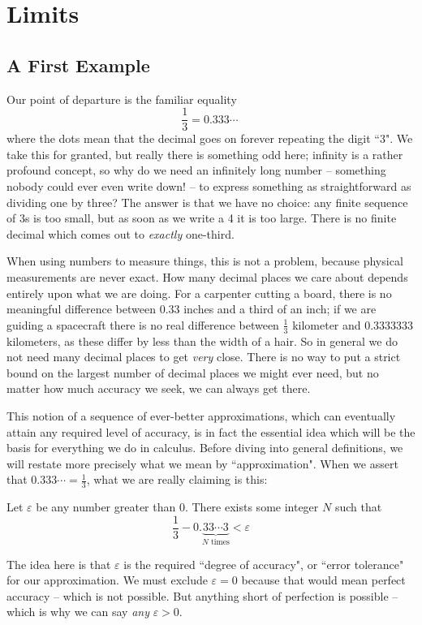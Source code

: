 \section{Limits}
\subsection{A First Example}
Our point of departure is the familiar equality 
\[\label{eq:onethird}
\frac{1}{3} = 0.333\cdots\ 
\]
where the dots mean that the decimal goes on forever repeating the digit ``3". We take this for granted, but really there is something odd here; infinity is a rather profound concept, so why do we need an infinitely long number -- something nobody could ever even write down! -- to express something as straightforward as dividing one by three? The answer is that we have no choice: any finite sequence of 3s is too small, but as soon as we write a 4 it is too large. There is no finite decimal which comes out to \emph{exactly} one-third. 

When using numbers to measure things, this is not a problem, because physical measurements are never exact. How many decimal places we care about depends entirely upon what we are doing. For a carpenter cutting a board, there is no meaningful difference between 0.33 inches and a third of an inch; if we are guiding a spacecraft there is no real difference between $\frac{1}{3}$ kilometer and 0.3333333 kilometers, as these differ by less than the width of a hair. So in general we do not need many decimal places to get \emph{very} close. There is no way to put a strict bound on the largest number of decimal places we might ever need, but no matter how much accuracy we seek, we can always get there. 

This notion of a sequence of ever-better approximations, which can eventually attain any required level of accuracy, is in fact the essential idea which will be the basis for everything we do in calculus. Before diving into general definitions, we will restate more precisely what we mean by  ``approximation". When we assert that $0.333\cdots = \frac{1}{3}$, what we are really claiming is this:

\begin{thm}\label{thm:onethird}
Let $\varepsilon$ be any number greater than 0. There exists some integer $N$ such that
\[
\frac{1}{3} - 0.\underbrace{33\cdots3}_\text{$N$ times} < \varepsilon 
\]
\end{thm}

The idea here is that $\varepsilon$ is the required ``degree of accuracy", or ``error tolerance" for our approximation. We must exclude $\varepsilon=0$ because that would mean perfect accuracy -- which is not possible. But anything short of perfection is possible -- which is why we can say \emph{any} $\varepsilon>0$. 

